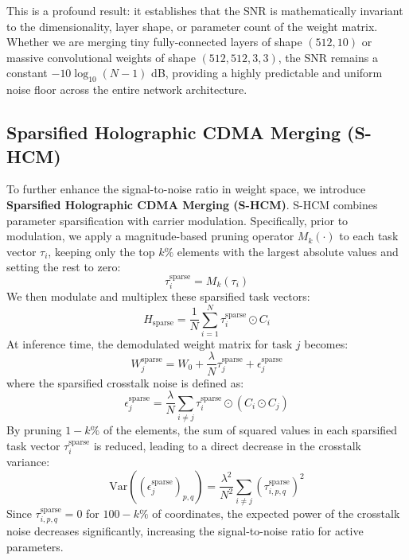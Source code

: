 \documentclass{article}
\begin{document}
This is a profound result: it establishes that the SNR is mathematically invariant to the dimensionality, layer shape, or parameter count of the weight matrix. Whether we are merging tiny fully-connected layers of shape $(512, 10)$ or massive convolutional weights of shape $(512, 512, 3, 3)$, the SNR remains a constant $-10 \log_{10}(N-1)$ dB, providing a highly predictable and uniform noise floor across the entire network architecture.

\subsection{Sparsified Holographic CDMA Merging (S-HCM)}
\label{sec:s_hcm}
To further enhance the signal-to-noise ratio in weight space, we introduce \textbf{Sparsified Holographic CDMA Merging (S-HCM)}. S-HCM combines parameter sparsification with carrier modulation. Specifically, prior to modulation, we apply a magnitude-based pruning operator $M_k(\cdot)$ to each task vector $\tau_i$, keeping only the top $k\%$ elements with the largest absolute values and setting the rest to zero:
\begin{equation}
    \tau_i^{\text{sparse}} = M_k(\tau_i)
\end{equation}
We then modulate and multiplex these sparsified task vectors:
\begin{equation}
    H_{\text{sparse}} = \frac{1}{N} \sum_{i=1}^N \tau_i^{\text{sparse}} \odot C_i
\end{equation}
At inference time, the demodulated weight matrix for task $j$ becomes:
\begin{equation}
    W_j^{\text{sparse}} = W_0 + \frac{\lambda}{N} \tau_j^{\text{sparse}} + \epsilon_j^{\text{sparse}}
\end{equation}
where the sparsified crosstalk noise is defined as:
\begin{equation}
    \epsilon_j^{\text{sparse}} = \frac{\lambda}{N} \sum_{i \neq j} \tau_i^{\text{sparse}} \odot (C_i \odot C_j)
\end{equation}
By pruning $1 - k\%$ of the elements, the sum of squared values in each sparsified task vector $\tau_i^{\text{sparse}}$ is reduced, leading to a direct decrease in the crosstalk variance:
\begin{equation}
    \text{Var}((\epsilon_j^{\text{sparse}})_{p, q}) = \frac{\lambda^2}{N^2} \sum_{i \neq j} (\tau_{i, p, q}^{\text{sparse}})^2
\end{equation}
Since $\tau_{i, p, q}^{\text{sparse}} = 0$ for $100-k\%$ of coordinates, the expected power of the crosstalk noise decreases significantly, increasing the signal-to-noise ratio for active parameters.
\end{document}
